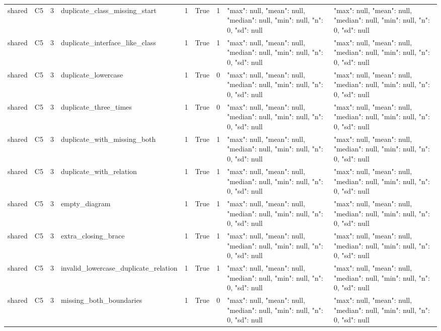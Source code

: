 \begin{tabular}{lllllllll}
shared & C5 & 3 & duplicate\_class\_missing\_start & 1 & True & 1 & {"max": null, "mean": null, "median": null, "min": null, "n": 0, "sd": null} & {"max": null, "mean": null, "median": null, "min": null, "n": 0, "sd": null} \\
shared & C5 & 3 & duplicate\_interface\_like\_class & 1 & True & 1 & {"max": null, "mean": null, "median": null, "min": null, "n": 0, "sd": null} & {"max": null, "mean": null, "median": null, "min": null, "n": 0, "sd": null} \\
shared & C5 & 3 & duplicate\_lowercase & 1 & True & 0 & {"max": null, "mean": null, "median": null, "min": null, "n": 0, "sd": null} & {"max": null, "mean": null, "median": null, "min": null, "n": 0, "sd": null} \\
shared & C5 & 3 & duplicate\_three\_times & 1 & True & 0 & {"max": null, "mean": null, "median": null, "min": null, "n": 0, "sd": null} & {"max": null, "mean": null, "median": null, "min": null, "n": 0, "sd": null} \\
shared & C5 & 3 & duplicate\_with\_missing\_both & 1 & True & 1 & {"max": null, "mean": null, "median": null, "min": null, "n": 0, "sd": null} & {"max": null, "mean": null, "median": null, "min": null, "n": 0, "sd": null} \\
shared & C5 & 3 & duplicate\_with\_relation & 1 & True & 1 & {"max": null, "mean": null, "median": null, "min": null, "n": 0, "sd": null} & {"max": null, "mean": null, "median": null, "min": null, "n": 0, "sd": null} \\
shared & C5 & 3 & empty\_diagram & 1 & True & 1 & {"max": null, "mean": null, "median": null, "min": null, "n": 0, "sd": null} & {"max": null, "mean": null, "median": null, "min": null, "n": 0, "sd": null} \\
shared & C5 & 3 & extra\_closing\_brace & 1 & True & 1 & {"max": null, "mean": null, "median": null, "min": null, "n": 0, "sd": null} & {"max": null, "mean": null, "median": null, "min": null, "n": 0, "sd": null} \\
shared & C5 & 3 & invalid\_lowercase\_duplicate\_relation & 1 & True & 1 & {"max": null, "mean": null, "median": null, "min": null, "n": 0, "sd": null} & {"max": null, "mean": null, "median": null, "min": null, "n": 0, "sd": null} \\
shared & C5 & 3 & missing\_both\_boundaries & 1 & True & 0 & {"max": null, "mean": null, "median": null, "min": null, "n": 0, "sd": null} & {"max": null, "mean": null, "median": null, "min": null, "n": 0, "sd": null} \\

\end{tabular}
